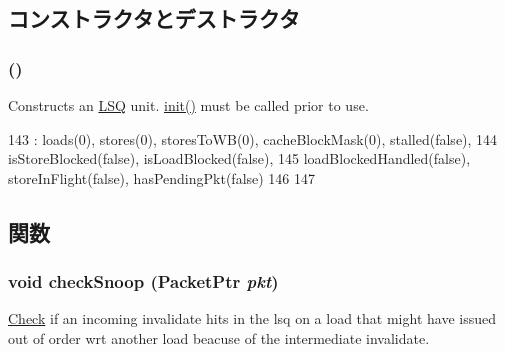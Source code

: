 \subsection{コンストラクタとデストラクタ}
\hypertarget{classLSQUnit_a0b23136c4d1c97aab007aa60e707763b}{
\subsubsection[{LSQUnit}]{ ()}}
\label{classLSQUnit_a0b23136c4d1c97aab007aa60e707763b}
Constructs an \hyperlink{classLSQ}{LSQ} unit. \hyperlink{classLSQUnit_a45b3b65ba551c17c3b200db265611a4c}{init()} must be called prior to use. 


\begin{DoxyCode}
143     : loads(0), stores(0), storesToWB(0), cacheBlockMask(0), stalled(false),
144       isStoreBlocked(false), isLoadBlocked(false),
145       loadBlockedHandled(false), storeInFlight(false), hasPendingPkt(false)
146 {
147 }
\end{DoxyCode}


\subsection{関数}
\hypertarget{classLSQUnit_a35b89a864d3af33a4b045b7fe0aa6b5a}{
\subsubsection[{checkSnoop}]{\setlength{\rightskip}{0pt plus 5cm}void checkSnoop ({\bf PacketPtr} {\em pkt})}}
\label{classLSQUnit_a35b89a864d3af33a4b045b7fe0aa6b5a}
\hyperlink{classCheck}{Check} if an incoming invalidate hits in the lsq on a load that might have issued out of order wrt another load beacuse of the intermediate invalidate. 


